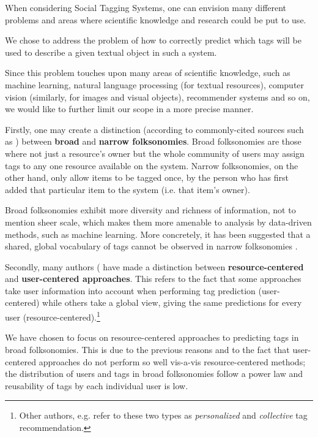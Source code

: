 When considering Social Tagging Systems, one can envision many different problems and areas where scientific knowledge and research could be put to use.

We chose to address the problem of how to correctly predict which tags will be used to describe a given textual object in such a system. 

Since this problem touches upon many areas of scientific knowledge, such as machine learning, natural language processing (for textual resources), computer vision (similarly, for images and visual objects), recommender systems and so on, we would like to further limit our scope in a more precise manner.

Firstly, one may create a distinction (according to commonly-cited sources such as \cite{wal_2005_broad_and_narrow}) between \textbf{broad} and \textbf{narrow folksonomies}. Broad folksonomies are those where not just a resource's owner but the whole community of users may assign tags to any one resource available on the system. Narrow folksonomies, on the other hand, only allow items to be tagged once, by the person who has first added that particular item to the system (i.e. that item's owner).

Broad folksonomies exhibit more diversity and richness of information, not to mention sheer scale, which makes them more amenable to analysis by data-driven methods, such as machine learning. More concretely, it has been suggested that a shared, global vocabulary of tags cannot be observed in narrow folksonomies \cite{schifanella_etal_2010}.

Secondly, many authors (\cite{illig_etal_2011,song_etal_2011} have made a distinction between \textbf{resource-centered} and \textbf{user-centered approaches}. This refers to the fact that some approaches take user information into account when performing tag prediction (user-centered) while others take a global view, giving the same predictions for every user (resource-centered).\footnote{Other authors, e.g. \cite{zhang_etal_2014} refer to these two types as \textit{personalized} and \textit{collective} tag recommendation.}

We have chosen to focus on resource-centered approaches to predicting tags in broad folksonomies. This is due to the previous reasons and to the fact \citep{song_etal_2011} that user-centered approaches do not perform so well vis-a-vis resource-centered methods; the distribution of users and tags in broad folksonomies follow a power law and reusability of tags by each individual user is low. 


